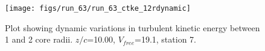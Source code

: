 \begin{figure}[H]
\centering
\texttt{[image: figs/run\_63/run\_63\_ctke\_12rdynamic]}
\caption{Plot showing dynamic variations in turbulent kinetic energy between 1 and 2 core radii. $z/c$=10.00, $V_{free}$=19.1, station 7.}
\end{figure}


